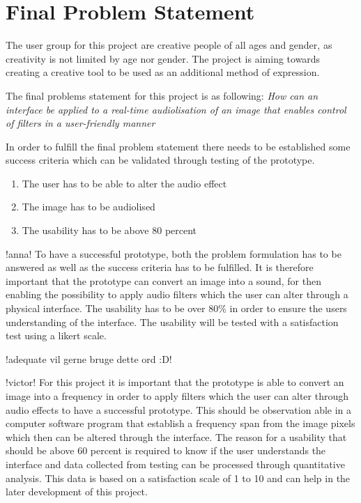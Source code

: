 \chapter{Final Problem Statement}\label{ch:finalproblem}

The user group for this project are creative people of all ages and gender, as creativity is not limited by age nor gender. 
The project is aiming towards creating a creative tool to be used as an additional method of expression. 

The final problems statement for this project is as following:
\textit{How can an interface be applied to a real-time audiolisation of an image that enables control of filters in a user-friendly manner}

In order to fulfill the final problem statement there needs to be established some success criteria which can be validated through testing of the prototype. 
\begin{enumerate}
\item The user has to be able to alter the audio effect
\item The image has to be audiolised 
\item The usability has to be above 80 percent
\end{enumerate}

!anna!
To have a successful prototype, both the problem formulation has to be answered as well as the success criteria has to be fulfilled. It is therefore important that the prototype can convert an image into a sound, for then enabling the possibility to apply audio filters which the user can alter through a physical interface. The usability has to be over 80\% in order to ensure the users understanding of the interface. The usability will be tested with a satisfaction test using a likert scale.

!adequate vil gerne bruge dette ord :D!

!victor!
For this project it is important that the prototype is able to convert an image into a frequency in order to apply filters which the user can alter through audio effects to have a successful prototype. This should be observation able in a computer software program that establish a frequency span from the image pixels which then can be altered through the interface. The reason for a usability that should be above 60 percent is required to know if the user understands the interface and data collected from testing can be processed through quantitative analysis. This data is based on a satisfaction scale of 1 to 10 and can help in the later development of this project. 

